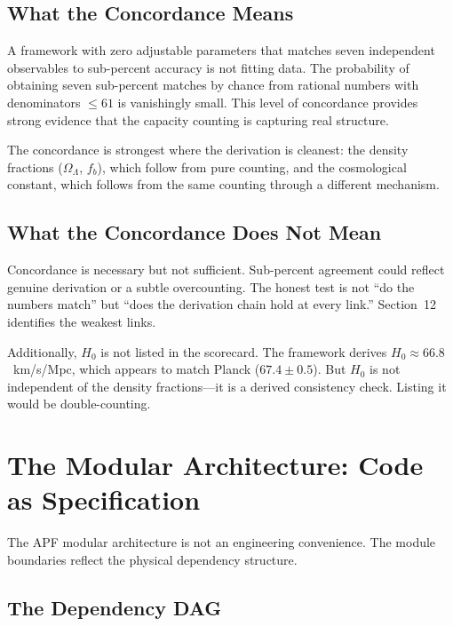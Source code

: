 \documentclass[11pt]{article}
\begin{document}
\subsection{What the Concordance Means}

A framework with zero adjustable parameters that matches seven independent observables to sub-percent accuracy is not fitting data.  The probability of obtaining seven sub-percent matches by chance from rational numbers with denominators $\le 61$ is vanishingly small.  This level of concordance provides strong evidence that the capacity counting is capturing real structure.

The concordance is strongest where the derivation is cleanest: the density fractions ($\Omega_\Lambda$, $f_b$), which follow from pure counting, and the cosmological constant, which follows from the same counting through a different mechanism.


\subsection{What the Concordance Does Not Mean}

Concordance is necessary but not sufficient.  Sub-percent agreement could reflect genuine derivation or a subtle overcounting.  The honest test is not ``do the numbers match'' but ``does the derivation chain hold at every link.''  Section~12 identifies the weakest links.

Additionally, $H_0$ is not listed in the scorecard.  The framework derives $H_0 \approx 66.8$~km/s/Mpc, which appears to match Planck ($67.4 \pm 0.5$).  But $H_0$ is not independent of the density fractions---it is a derived consistency check.  Listing it would be double-counting.


\section{The Modular Architecture: Code as Specification}

The APF modular architecture is not an engineering convenience.  The module boundaries reflect the physical dependency structure.

\subsection{The Dependency DAG}
\end{document}
